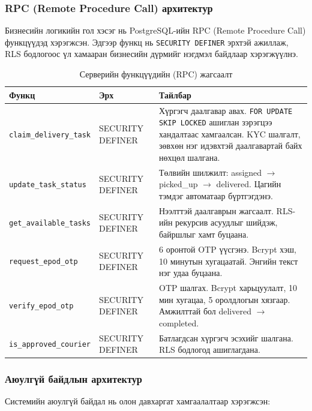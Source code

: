 \subsubsection{RPC (Remote Procedure Call) архитектур}
\label{subsubsec:rpc_architecture}

Бизнесийн логикийн гол хэсэг нь PostgreSQL-ийн RPC (Remote Procedure Call) функцүүдэд хэрэгжсэн. Эдгээр функц нь \texttt{SECURITY DEFINER} эрхтэй ажиллаж, RLS бодлогоос үл хамааран бизнесийн дүрмийг нэгдмэл байдлаар хэрэгжүүлнэ.

\begin{table}[H]
\centering
\renewcommand{\arraystretch}{1.1}
\caption{Серверийн функцүүдийн (RPC) жагсаалт}
\footnotesize
\begin{tabular}{|p{3.8cm}|p{1.7cm}|p{7.5cm}|}
\hline
\textbf{Функц} & \textbf{Эрх} & \textbf{Тайлбар} \\
\hline
\texttt{claim\_delivery\_task} & SECURITY DEFINER & Хүргэгч даалгавар авах. \texttt{FOR UPDATE SKIP LOCKED} ашиглан зэрэгцээ хандалтаас хамгаалсан. KYC шалгалт, зөвхөн нэг идэвхтэй даалгавартай байх нөхцөл шалгана. \\
\hline
\texttt{update\_task\_status} & SECURITY DEFINER & Төлвийн шилжилт: assigned $\rightarrow$ picked\_up $\rightarrow$ delivered. Цагийн тэмдэг автоматаар бүртгэгдэнэ. \\
\hline
\texttt{get\_available\_tasks} & SECURITY DEFINER & Нээлттэй даалгаврын жагсаалт. RLS-ийн рекурсив асуудлыг шийдэж, байршлыг хамт буцаана. \\
\hline
\texttt{request\_epod\_otp} & SECURITY DEFINER & 6 оронтой OTP үүсгэнэ. Bcrypt хэш, 10 минутын хугацаатай. Энгийн текст нэг удаа буцаана. \\
\hline
\texttt{verify\_epod\_otp} & SECURITY DEFINER & OTP шалгах. Bcrypt харьцуулалт, 10 мин хугацаа, 5 оролдлогын хязгаар. Амжилттай бол delivered $\rightarrow$ completed. \\
\hline
\texttt{is\_approved\_courier} & SECURITY DEFINER & Батлагдсан хүргэгч эсэхийг шалгана. RLS бодлогод ашиглагдана. \\
\hline
\end{tabular}
\end{table}


\subsubsection{Аюулгүй байдлын архитектур}
\label{subsubsec:security_architecture}

Системийн аюулгүй байдал нь олон давхаргат хамгаалалтаар хэрэгжсэн:

